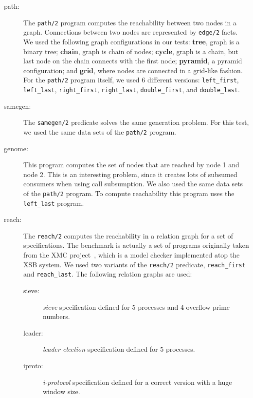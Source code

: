 \begin{description}
   
   \item[path:] The \texttt{path/2} program computes the reachability between two nodes in a graph.
   Connections between two nodes are represented by \texttt{edge/2} facts.
   We used the following graph configurations in our tests: \textbf{tree}, graph is a
   binary tree; \textbf{chain}, graph is chain of nodes; \textbf{cycle}, graph is a chain, but
   last node on the chain connects with the first node; \textbf{pyramid}, a pyramid configuration;
   and \textbf{grid}, where nodes are connected in a grid-like fashion.
   For the \texttt{path/2} program itself, we used 6 different versions: \texttt{left\_first},
   \texttt{left\_last}, \texttt{right\_first}, \texttt{right\_last},
   \texttt{double\_first}, and \texttt{double\_last}.
    
   \item[samegen:] The \texttt{samegen/2} predicate solves the same generation problem.
   For this test, we used the same data sets of the \texttt{path/2} program.
   
   \item[genome:] This program computes the set of nodes that are reached by node 1 and node 2.
   This is an interesting problem, since it creates lots of subsumed consumers when using
   call subsumption. We also used the same data sets of the \texttt{path/2} program.
   To compute reachability this program uses the \texttt{left\_last} program.
   
   \item[reach:] The \texttt{reach/2} computes the reachability in a relation graph for a set of
   specifications. The benchmark is actually a set of programs originally taken from the
   XMC project~\cite{system-xmc,RamakrishnanCR-00}, which is a model checker implemented
   atop the XSB system. We used two variants of the \texttt{reach/2} predicate,
   \texttt{reach\_first} and \texttt{reach\_last}.
   The following relation graphs are used:
   
      \begin{description}
         
         \item[sieve:] \emph{sieve} specification defined for 5 processes and 4 overflow prime numbers.
         
         \item[leader:] \emph{leader election} specification defined for 5 processes.
         
         \item[iproto:] \emph{i-protocol} specification defined for a correct version with a huge window size.

      \end{description}
\end{description}

